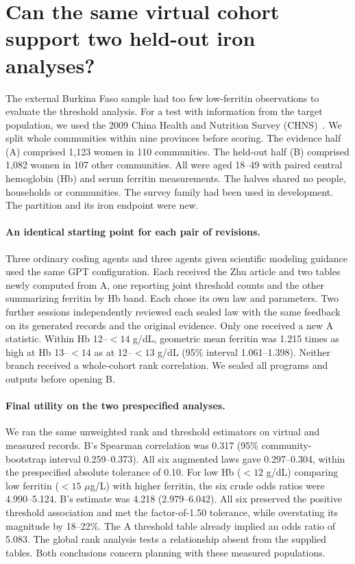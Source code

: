 \documentclass[sigconf,anonymous,review]{acmart}
\begin{document}
\section{Can the same virtual cohort support two held-out iron analyses?}
\label{sec:chns}
The external Burkina Faso sample had too few low-ferritin observations to evaluate the threshold analysis. For a test with information from the target population, we used the 2009 China Health and Nutrition Survey (CHNS)~\cite{chnsbio,chnsind}. We split whole communities within nine provinces before scoring. The evidence half (A) comprised 1,123 women in 110 communities. The held-out half (B) comprised 1,082 women in 107 other communities. All were aged 18--49 with paired central hemoglobin (Hb) and serum ferritin measurements. The halves shared no people, households or communities. The survey family had been used in development. The partition and its iron endpoint were new.

\paragraph{An identical starting point for each pair of revisions.}
Three ordinary coding agents and three agents given scientific modeling guidance used the same GPT configuration. Each received the Zhu article and two tables newly computed from A, one reporting joint threshold counts and the other summarizing ferritin by Hb band. Each chose its own law and parameters. Two further sessions independently reviewed each sealed law with the same feedback on its generated records and the original evidence. Only one received a new A statistic. Within Hb 12--$<14$ g/dL, geometric mean ferritin was 1.215 times as high at Hb 13--$<14$ as at 12--$<13$ g/dL (95\% interval 1.061--1.398). Neither branch received a whole-cohort rank correlation. We sealed all programs and outputs before opening B.

\paragraph{Final utility on the two prespecified analyses.}
We ran the same unweighted rank and threshold estimators on virtual and measured records. B's Spearman correlation was 0.317 (95\% community-bootstrap interval 0.259--0.373). All six augmented laws gave 0.297--0.304, within the prespecified absolute tolerance of 0.10. For low Hb ($<12$ g/dL) comparing low ferritin ($<15$ $\mu$g/L) with higher ferritin, the six crude odds ratios were 4.990--5.124. B's estimate was 4.218 (2.979--6.042). All six preserved the positive threshold association and met the factor-of-1.50 tolerance, while overstating its magnitude by 18--22\%. The A threshold table already implied an odds ratio of 5.083. The global rank analysis tests a relationship absent from the supplied tables. Both conclusions concern planning with these measured populations.
\end{document}
